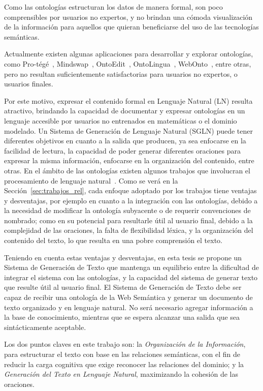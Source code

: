 \documentclass[11pt,a4paper,spanish]{book}
\begin{document}
Como las ontologías estructuran los datos de manera formal, son poco comprensibles por usuarios no expertos, y no brindan una cómoda visualización de la información para aquellos que quieran beneficiarse del uso de las tecnologías semánticas.

Actualmente existen algunas aplicaciones para  desarrollar y explorar ontologías, como Pro-tégé~\cite{protege}, Mindswap~\cite{golbeck2002new}, OntoEdit~\cite{sure2002ontoedit}, OntoLingua~\cite{farquhar1997ontolingua}, WebOnto~\cite{domingue1998tadzebao}, entre otras, pero no resultan suficientemente satisfactorias para usuarios no expertos, o usuarios finales. 

Por este motivo, expresar el contenido formal en Lenguaje Natural (LN) resulta atractivo, brindando la capacidad de documentar y expresar ontologías en un lenguaje accesible por usuarios no entrenados en matemáticas o el dominio modelado. Un Sistema de Generación de Lenguaje Natural (SGLN) puede tener diferentes objetivos en cuanto a la salida que producen, ya sea enfocarse en la facilidad de lectura, la capacidad de poder generar diferentes oraciones para expresar la misma información,  enfocarse en la organización del contenido, entre otras. En el ámbito de las ontologías existen algunos trabajos que involucran el procesamiento de lenguaje natural~\cite{moreno2018ontologia}\cite{perez2002explotacion}\cite{vallez2009web}. Como se verá en la Sección~\ref{sec:trabajos_rel}, cada enfoque adoptado por los trabajos tiene ventajas y desventajas, por ejemplo en cuanto a la integración con las ontologías, debido a la necesidad de modificar la ontología subyacente o de requerir convenciones de nombrado; como en su potencial para resultarle útil al usuario final, debido a la complejidad de las oraciones, la falta de flexibilidad léxica, y la organización del contenido del texto, lo que resulta en una pobre comprensión el texto.  

Teniendo en cuenta estas ventajas y desventajas, en esta tesis se propone un Sistema de Generación de Texto que mantenga un equilibrio entre la dificultad de integrar el sistema con las ontologías, y la capacidad del sistema de generar texto que resulte útil al usuario final. El Sistema de Generación de Texto debe   ser capaz de recibir una ontología de la Web Semántica y generar un documento de texto organizado y en lenguaje natural. No será necesario agregar información a la base de conocimiento, mientras que se espera alcanzar una salida que sea sintácticamente aceptable.

Los dos puntos claves en este trabajo son: la \textit{Organización de la Información}, para estructurar el texto con base en las relaciones semánticas, con el fin de reducir la carga cognitiva que exige reconocer las relaciones del dominio; y la \textit{Generación del Texto en Lenguaje Natural}, maximizando la cohesión de las oraciones.
\end{document}
